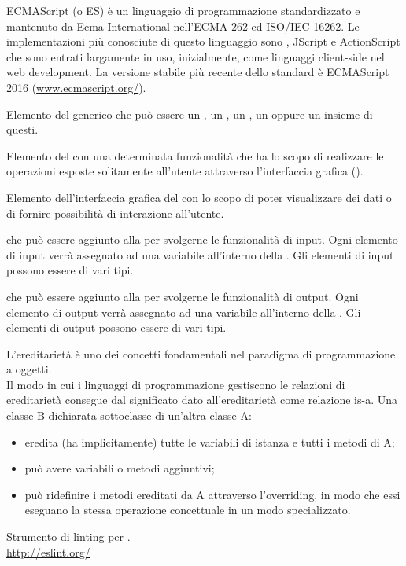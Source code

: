 ECMAScript (o ES) è un linguaggio di programmazione standardizzato e mantenuto da Ecma International nell'ECMA-262 ed ISO/IEC 16262. Le implementazioni più conosciute di questo linguaggio sono , JScript e ActionScript che sono entrati largamente in uso, inizialmente, come linguaggi client-side nel web development.
La versione stabile più recente dello standard è ECMAScript 2016 (\url{www.ecmascript.org/}).

Elemento del  generico che può essere un , un , un , un  oppure un insieme di questi.

Elemento del  con una determinata funzionalità che ha lo scopo di realizzare le operazioni esposte solitamente all'utente attraverso l’interfaccia grafica ().

Elemento dell’interfaccia grafica del  con lo scopo di poter visualizzare dei dati o di fornire possibilità di interazione all’utente.

 che può essere aggiunto alla  per svolgerne le funzionalità di input. Ogni elemento di input verrà assegnato ad una variabile all’interno della . Gli elementi di input possono essere di vari tipi.

 che può essere aggiunto alla  per svolgerne le funzionalità di output. Ogni elemento di output verrà assegnato ad una variabile all’interno della . Gli elementi di output possono essere di vari tipi.

L'ereditarietà è uno dei concetti fondamentali nel paradigma di programmazione a oggetti.\\
Il modo in cui i linguaggi di programmazione gestiscono le relazioni di ereditarietà consegue dal significato dato all'ereditarietà come relazione is-a. Una classe B dichiarata sottoclasse di un'altra classe A:
\begin{itemize}
    \item eredita (ha implicitamente) tutte le variabili di istanza e tutti i metodi di A;
    \item può avere variabili o metodi aggiuntivi;
    \item può ridefinire i metodi ereditati da A attraverso l'overriding, in modo che essi eseguano la stessa operazione concettuale in un modo specializzato.
\end{itemize}

Strumento di linting per .\\
\url{http://eslint.org/}
\clearpage

